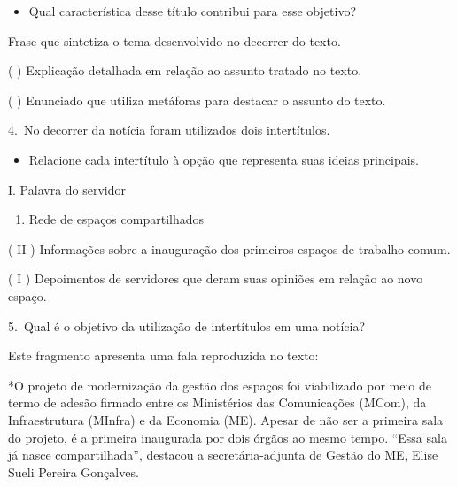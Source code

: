 \begin{itemize}
\begin{itemize}
{\begin{itemize}
\begin{itemize}
\tightlist
\item
  Qual característica desse título contribui para esse objetivo?
\end{itemize}

 Frase que sintetiza o tema desenvolvido no decorrer do texto.

( ) Explicação detalhada em relação ao assunto tratado no texto.

( ) Enunciado que utiliza metáforas para destacar o assunto do texto.

4.~No decorrer da notícia foram utilizados dois intertítulos.

\begin{itemize}
\tightlist
\item
  Relacione cada intertítulo à opção que representa suas ideias
  principais.
\end{itemize}

I. Palavra do servidor

\begin{enumerate}
\def\labelenumi{\Roman{enumi}.}
\setcounter{enumi}{1}
\tightlist
\item
  Rede de espaços compartilhados
\end{enumerate}

( II ) Informações sobre a inauguração dos primeiros espaços de trabalho
comum.

( I ) Depoimentos de servidores que deram suas opiniões em relação ao
novo espaço.

5.~Qual é o objetivo da utilização de intertítulos em uma notícia?



Este fragmento apresenta uma fala reproduzida no texto:

*O projeto de modernização da gestão dos espaços foi viabilizado por
meio de termo de adesão firmado entre os Ministérios das Comunicações
(MCom), da Infraestrutura (MInfra) e da Economia (ME). Apesar de não ser
a primeira sala do projeto, é a primeira inaugurada por dois órgãos ao
mesmo tempo. ``Essa sala já nasce compartilhada'', destacou a
secretária-adjunta de Gestão do ME, Elise Sueli Pereira Gonçalves.


\end{itemize}}
\end{itemize}
\end{itemize}
